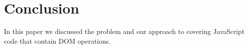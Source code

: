 \section{Conclusion}
In this paper we discussed the problem and our approach to covering JavaScript code that contain DOM operations.  

